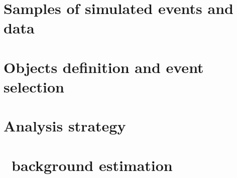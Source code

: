 \documentclass[NOTE, atlasdraft=true, texlive=2016, UKenglish]{atlasdoc}
\begin{document}
\FloatBarrier
\section{Samples of simulated events and data}%
\label{sec:samples}



%


\FloatBarrier
\section{Objects definition and event selection}%
\label{sec:event_selection}



\FloatBarrier
\section{Analysis strategy}%
\label{sec:strategy}



\FloatBarrier
\section{\ttbar\ background estimation}%
\label{sec:ttbar_rew}

\end{document}
